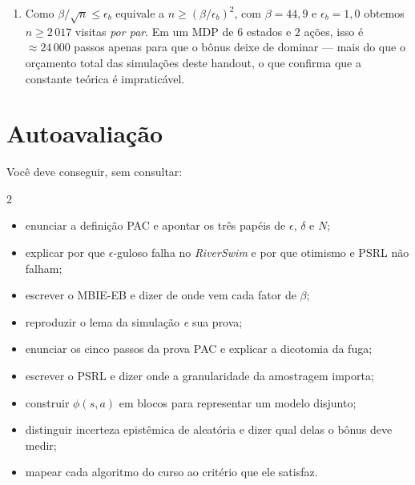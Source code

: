 \documentclass[11pt, a4paper]{article}
\newcommand{\feat}{\phi}
\begin{document}
\begin{enumerate}
\[          \feat(s,a_2) = \begin{pmatrix}0 \\ \feat(s)\\ 0\end{pmatrix},\quad
          \feat(s,a_3) = \begin{pmatrix}0 \\ 0 \\ \feat(s)\end{pmatrix}
          \in \R^{6},
        \]
        o produto interno anula todos os blocos exceto o de $a$, restando
        $\theta_a^{\!\top}\feat(s)$.
  \item[\textbf{E6.}] Como $\beta/\sqrt{n} \le \epsilon_b$ equivale a
        $n \ge (\beta/\epsilon_b)^2$, com $\beta = 44{,}9$ e $\epsilon_b = 1{,}0$
        obtemos $n \ge 2\,017$ visitas \emph{por par}.
        Em um MDP de $6$ estados e $2$ ações, isso é $\approx 24\,000$ passos apenas para
        que o bônus deixe de dominar --- mais do que o orçamento total das simulações
        deste handout, o que confirma que a constante teórica é impraticável.
\end{enumerate}

\section{Autoavaliação}

Você deve conseguir, sem consultar:

\begin{multicols}{2}
\begin{itemize}\setlength{\itemsep}{0.05em}
  \item enunciar a definição PAC e apontar os três papéis de $\epsilon$, $\delta$ e $N$;
  \item explicar por que $\epsilon$-guloso falha no \textit{RiverSwim} e por que otimismo
        e PSRL não falham;
  \item escrever o MBIE-EB e dizer de onde vem cada fator de $\beta$;
  \item reproduzir o lema da simulação \emph{e} sua prova;
  \item enunciar os cinco passos da prova PAC e explicar a dicotomia da fuga;
  \item escrever o PSRL e dizer onde a granularidade da amostragem importa;
  \item construir $\feat(s,a)$ em blocos para representar um modelo disjunto;
  \item distinguir incerteza epistêmica de aleatória e dizer qual delas o bônus deve medir;
  \item mapear cada algoritmo do curso ao critério que ele satisfaz.
\end{itemize}
\end{multicols}
\end{document}
